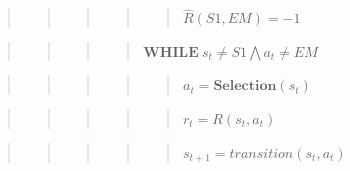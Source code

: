 \documentclass[10pt,a4paper,onecolumn]{article}
\begin{document}
\begin{quote}
\begin{quote}
\begin{quote}
\begin{quote}
\begin{quote}
\(\hat{R}(S1, EM) = -1\)
\end{quote}
\end{quote}
\end{quote}
\end{quote}
\end{quote}

\begin{quote}
\begin{quote}
\begin{quote}
\begin{quote}
\(\textbf{WHILE}\ s_t \neq S1 \bigwedge a_t \neq EM\)
\end{quote}
\end{quote}
\end{quote}
\end{quote}

\begin{quote}
\begin{quote}
\begin{quote}
\begin{quote}
\begin{quote}
\(a_t = \textbf{Selection}(s_t)\)
\end{quote}
\end{quote}
\end{quote}
\end{quote}
\end{quote}

\begin{quote}
\begin{quote}
\begin{quote}
\begin{quote}
\begin{quote}
\(r_t = R(s_t,a_t)\)
\end{quote}
\end{quote}
\end{quote}
\end{quote}
\end{quote}

\begin{quote}
\begin{quote}
\begin{quote}
\begin{quote}
\begin{quote}
\(s_{t+1} = transition(s_t, a_t)\)
\end{quote}
\end{quote}
\end{quote}
\end{quote}
\end{quote}
\end{document}
